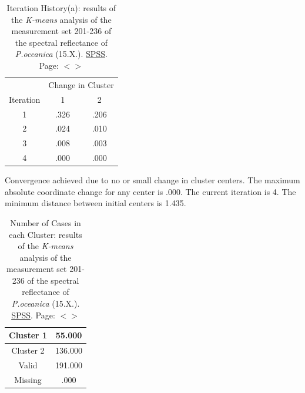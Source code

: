 \documentclass[11pt]{article}
\begin{document}
\begin{appendices}
\begin{table}[H]
	\caption{Iteration History(a): results of the \textit{K-means} analysis of the measurement set 201-236 of the spectral reflectance of \textit{P.oceanica} (15.X.).  \href{http://www.spss.com/}{SPSS}. Page: $<$\pageref{page-41}$>$}
	\begin{center}
	\begin{tabular}{|c|c|c|}
		\hline\hline
		& \multicolumn{2}{|c|}{Change in Cluster} \\
		 Iteration & 1 & 2 \\ \hline\hline
		1 &	.326 &	.206 \\ \hline
		2 &	.024 & 	.010 \\ \hline
		3 &	.008 &	.003 \\ \hline
		4 &	.000 &	.000 \\ \hline
	\end{tabular}
	\end{center}
	Convergence achieved due to no or small change in cluster centers. The maximum absolute coordinate change for any center is .000. The current iteration is 4. The minimum distance between initial centers is 1.435.
\label{tab:21}
\end{table}

\begin{table}[H]
	\caption{Number of Cases in each Cluster: results of the \textit{K-means} analysis of the measurement set 201-236 of the spectral reflectance of \textit{P.oceanica} (15.X.).  \href{http://www.spss.com/}{SPSS}. Page: $<$\pageref{page-41}$>$}
		\begin{center}
		\begin{tabular}{|c|c|}
		\hline\hline
			Cluster 1 & 55.000 \\ \hline
			Cluster 2 & 136.000 \\ \hline
			Valid &	191.000 \\ \hline
			Missing & .000 \\ \hline
		\end{tabular}
		\end{center}
	\label{tab:22}
\end{table}


\end{appendices}
\end{document}
